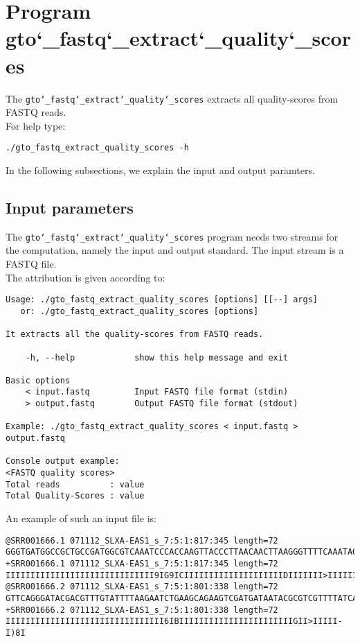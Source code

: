 \section{Program gto\char`_fastq\char`_extract\char`_quality\char`_scores}
The \texttt{gto\char`_fastq\char`_extract\char`_quality\char`_scores} extracts all quality-scores from FASTQ reads.\\
For help type:
\begin{lstlisting}
./gto_fastq_extract_quality_scores -h
\end{lstlisting}
In the following subsections, we explain the input and output paramters.

\subsection*{Input parameters}

The \texttt{gto\char`_fastq\char`_extract\char`_quality\char`_scores} program needs two streams for the computation, namely the input and output standard. The input stream is a FASTQ file.\\
The attribution is given according to:
\begin{lstlisting}
Usage: ./gto_fastq_extract_quality_scores [options] [[--] args]
   or: ./gto_fastq_extract_quality_scores [options]

It extracts all the quality-scores from FASTQ reads.

    -h, --help            show this help message and exit

Basic options
    < input.fastq         Input FASTQ file format (stdin)
    > output.fastq        Output FASTQ file format (stdout)

Example: ./gto_fastq_extract_quality_scores < input.fastq > output.fastq

Console output example:
<FASTQ quality scores>
Total reads          : value
Total Quality-Scores : value
\end{lstlisting}
An example of such an input file is:
\begin{lstlisting}
@SRR001666.1 071112_SLXA-EAS1_s_7:5:1:817:345 length=72
GGGTGATGGCCGCTGCCGATGGCGTCAAATCCCACCAAGTTACCCTTAACAACTTAAGGGTTTTCAAATAGA
+SRR001666.1 071112_SLXA-EAS1_s_7:5:1:817:345 length=72
IIIIIIIIIIIIIIIIIIIIIIIIIIIIII9IG9ICIIIIIIIIIIIIIIIIIIIIDIIIIIII>IIIIII/
@SRR001666.2 071112_SLXA-EAS1_s_7:5:1:801:338 length=72
GTTCAGGGATACGACGTTTGTATTTTAAGAATCTGAAGCAGAAGTCGATGATAATACGCGTCGTTTTATCAT
+SRR001666.2 071112_SLXA-EAS1_s_7:5:1:801:338 length=72
IIIIIIIIIIIIIIIIIIIIIIIIIIIIIIII6IBIIIIIIIIIIIIIIIIIIIIIIIGII>IIIII-I)8I
\end{lstlisting}

